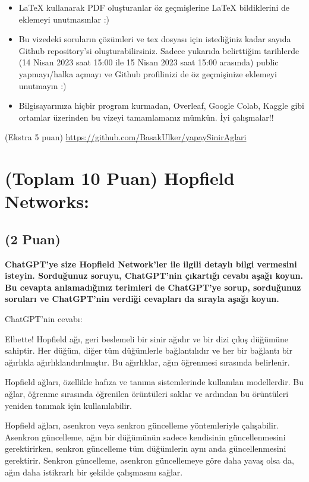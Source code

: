 \documentclass[11pt]{article}
\begin{document}
\begin{itemize}
    \item LaTeX kullanarak PDF oluşturanlar öz geçmişlerine LaTeX bildiklerini de eklemeyi unutmasınlar :)
    \item Bu vizedeki soruların çözümleri ve tex dosyası için istediğiniz kadar sayıda Github repository'si oluşturabilirsiniz. Sadece yukarıda belirttiğim tarihlerde (14 Nisan 2023 saat 15:00 ile 15 Nisan 2023 saat 15:00 arasında) public yapmayı/halka açmayı ve Github profilinizi de öz geçmişinize eklemeyi unutmayın :)
    \item Bilgisayarınıza hiçbir program kurmadan, Overleaf, Google Colab, Kaggle gibi ortamlar üzerinden bu vizeyi tamamlamanız mümkün. İyi çalışmalar!!
\end{itemize}

(Ekstra 5 puan) \url{https://github.com/BasakUlker/yapaySinirAglari}

\newpage
\section{(Toplam 10 Puan) Hopfield Networks:}

\subsection{(2 Puan)} \textbf{ChatGPT’ye size Hopfield Network’ler ile ilgili detaylı bilgi vermesini isteyin. Sorduğunuz soruyu, ChatGPT'nin çıkartığı cevabı aşağı koyun. Bu cevapta anlamadığınız terimleri de ChatGPT’ye sorup, sorduğunuz soruları ve ChatGPT’nin verdiği cevapları da sırayla aşağı koyun.}

ChatGPT'nin cevabı:

Elbette! Hopfield ağı, geri beslemeli bir sinir ağıdır ve bir dizi çıkış düğümüne sahiptir. Her düğüm, diğer tüm düğümlerle bağlantılıdır ve her bir bağlantı bir ağırlıkla ağırlıklandırılmıştır. Bu ağırlıklar, ağın öğrenmesi sırasında belirlenir.

Hopfield ağları, özellikle hafıza ve tanıma sistemlerinde kullanılan modellerdir. Bu ağlar, öğrenme sırasında öğrenilen örüntüleri saklar ve ardından bu örüntüleri yeniden tanımak için kullanılabilir.

Hopfield ağları, asenkron veya senkron güncelleme yöntemleriyle çalışabilir. Asenkron güncelleme, ağın bir düğümünün sadece kendisinin güncellenmesini gerektirirken, senkron güncelleme tüm düğümlerin aynı anda güncellenmesini gerektirir. Senkron güncelleme, asenkron güncellemeye göre daha yavaş olsa da, ağın daha istikrarlı bir şekilde çalışmasını sağlar.
\end{document}
